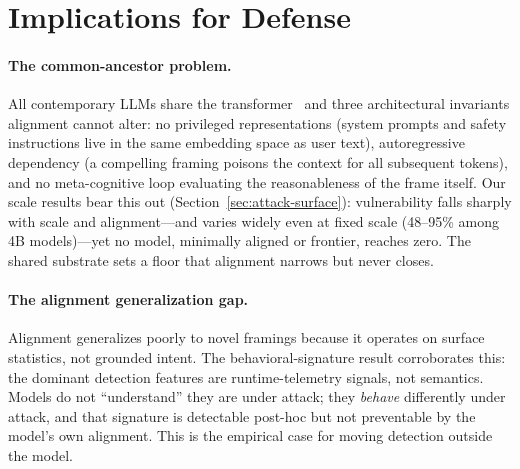 \documentclass{article}
\begin{document}
\section{Implications for Defense}

\paragraph{The common-ancestor problem.}
All contemporary LLMs share the transformer~\citep{vaswani2017attention} and three architectural invariants alignment cannot alter: no privileged representations (system prompts and safety instructions live in the same embedding space as user text), autoregressive dependency (a compelling framing poisons the context for all subsequent tokens), and no meta-cognitive loop evaluating the reasonableness of the frame itself. Our scale results bear this out (Section~\ref{sec:attack-surface}): vulnerability falls sharply with scale and alignment---and varies widely even at fixed scale (48--95\% among 4B models)---yet no model, minimally aligned or frontier, reaches zero. The shared substrate sets a floor that alignment narrows but never closes.

\paragraph{The alignment generalization gap.}
Alignment generalizes poorly to novel framings because it operates on surface statistics, not grounded intent. The behavioral-signature result corroborates this: the dominant detection features are runtime-telemetry signals, not semantics. Models do not ``understand'' they are under attack; they \emph{behave} differently under attack, and that signature is detectable post-hoc but not preventable by the model's own alignment. This is the empirical case for moving detection outside the model.
\end{document}
